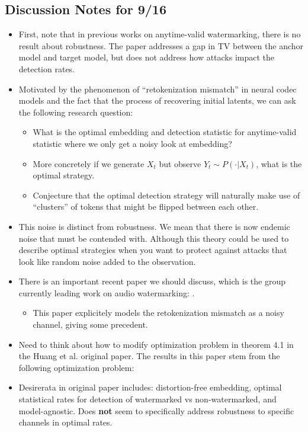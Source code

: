 \documentclass[12pt]{article}
\theoremstyle{plain}
\theoremstyle{definition}
\begin{document}
\subsection{Discussion Notes for 9/16}
\begin{itemize}
\item First, note that in previous works on anytime-valid watermarking, there is no result about robustness. The paper addresses a gap in TV between the anchor model and target model, but does not address how attacks impact the detection rates.
\item Motivated by the phenomenon of ``retokenization mismatch'' in neural codec models and the fact that the process of recovering initial latents, we can ask the following research question:
\begin{itemize}
    \item What is the optimal embedding and detection statistic for anytime-valid statistic where we only get a noisy look at embedding? 
    \item More concretely if we generate $X_t$ but observe $Y_t\sim P(\cdot|X_t)$, what is the optimal strategy.
    \item Conjecture that the optimal detection strategy will naturally make use of ``clusters'' of tokens that might be flipped between each other.
\end{itemize}
\item This noise is distinct from robustness. We mean that there is now endemic noise that must be contended with. Although this theory could be used to describe optimal strategies when you want to protect against attacks that look like random noise added to the observation.

\item There is an important recent paper we should discuss, which is the group currently leading work on audio watermarking: \cite{milis2026hidden}.
\begin{itemize}
    \item This paper explicitely models the retokenization mismatch as a noisy channel, giving some precedent.
\end{itemize}

\item Need to think about how to modify optimization problem in theorem 4.1 in the Huang et al. original paper.
The results in this paper stem from the following optimization problem:

\item Desirerata in original paper includes: distortion-free embedding, optimal statistical rates for detection of watermarked vs non-watermarked, and model-agnostic. Does \textbf{not} seem to specifically address robustness to specific channels in optimal rates. 


\end{itemize}
\end{document}
